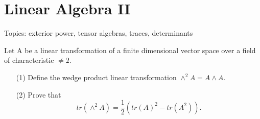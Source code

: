 \chapter{Linear Algebra II}
Topics: exterior power, tensor algebras, traces, determinants


\begin{prob}[F2016-Q5]
    Let A be a linear transformation of a finite dimensional vector space over a field of characteristic \(\neq 2\).
    \begin{itemize}
        \item[(1)] Define the wedge product linear transformation \(\wedge^{2}A=A\wedge A\).
        \item[(2)] Prove that
        \[tr(\wedge^{2}A)=\frac{1}{2}(tr(A)^{2}-tr(A^{2})).\]
    \end{itemize}
\end{prob}
